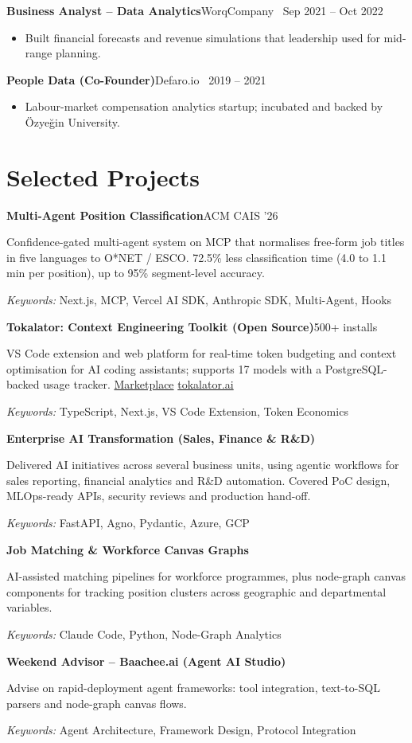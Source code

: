 \documentclass[10pt,a4paper]{article}
\newcommand{\role}[3]{%
  \par\needspace{3\baselineskip}\vspace{3pt}\textbf{#1}\hfill{\color{muted}#2 \textbar\ #3}\par}
\newcommand{\project}[2]{%
  \par\needspace{4\baselineskip}\vspace{4pt}\textbf{#1}\hfill{\color{muted}#2}\par}
\newcommand{\keywords}[1]{\par{\small\color{muted}\textit{Keywords:} #1}\par}
\begin{document}
\role{Business Analyst -- Data Analytics}{WorqCompany}{Sep 2021 -- Oct 2022}
\begin{itemize}
  \item Built financial forecasts and revenue simulations that leadership used for mid-range planning.
\end{itemize}

\role{People Data (Co-Founder)}{Defaro.io}{2019 -- 2021}
\begin{itemize}
  \item Labour-market compensation analytics startup; incubated and backed by \"Ozye\u{g}in University.
\end{itemize}

\section{Selected Projects}
\project{Multi-Agent Position Classification}{ACM CAIS '26}
Confidence-gated multi-agent system on MCP that normalises free-form job titles in five languages to O*NET / ESCO.
72.5\% less classification time (4.0 to 1.1 min per position), up to 95\% segment-level accuracy.
\keywords{Next.js, MCP, Vercel AI SDK, Anthropic SDK, Multi-Agent, Hooks}

\project{Tokalator: Context Engineering Toolkit (Open Source)}{500+ installs}
VS Code extension and web platform for real-time token budgeting and context optimisation for AI coding assistants;
supports 17 models with a PostgreSQL-backed usage tracker.
\href{https://marketplace.visualstudio.com/items?itemName=vfaraji89.tokalator}{Marketplace}\,\textbar\,\href{https://tokalator.ai}{tokalator.ai}
\keywords{TypeScript, Next.js, VS Code Extension, Token Economics}

\project{Enterprise AI Transformation (Sales, Finance \& R\&D)}{}
Delivered AI initiatives across several business units, using agentic workflows for sales reporting, financial
analytics and R\&D automation. Covered PoC design, MLOps-ready APIs, security reviews and production hand-off.
\keywords{FastAPI, Agno, Pydantic, Azure, GCP}

\project{Job Matching \& Workforce Canvas Graphs}{}
AI-assisted matching pipelines for workforce programmes, plus node-graph canvas components for tracking position
clusters across geographic and departmental variables.
\keywords{Claude Code, Python, Node-Graph Analytics}

\project{Weekend Advisor -- Baachee.ai (Agent AI Studio)}{}
Advise on rapid-deployment agent frameworks: tool integration, text-to-SQL parsers and node-graph canvas flows.
\keywords{Agent Architecture, Framework Design, Protocol Integration}
\end{document}
